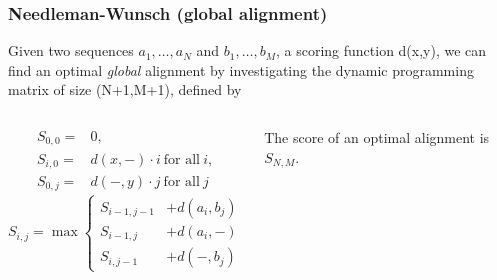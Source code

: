 \documentclass[aspectratio=1610]{beamer}
\begin{document}
\begin{frame}
\frametitle{Needleman-Wunsch (global alignment)}
Given two sequences $a_1,\ldots,a_N$ and $b_1,\ldots,b_M$, a scoring function d(x,y), we can find an optimal {\em global} alignment by investigating the dynamic programming matrix of size (N+1,M+1), defined by
\begin{columns}


\begin{align*}
 S_{0,0} =& 0, \\
S_{i,0} =& d(x,-) \cdot i \ \textrm{for all}\ i, \\
S_{0,j} =&  d(-,y) \cdot j\ \textrm{for all}\ j 
\end{align*}
\[ 
S_{i,j}=\max
\begin{cases}
   S_{i-1,j-1} & + d(a_i,b_j)\\
   S_{i-1,j} & + d(a_i,-)\\
   S_{i,j-1} & + d(-,b_j)
\end{cases}
\]

The score of an optimal alignment is $\displaystyle S_{N,M}$.

\begin{overprint}
\vspace{1cm}
\begin{center}
\end{center}


\end{overprint}

\end{columns}

\end{frame}
\end{document}
